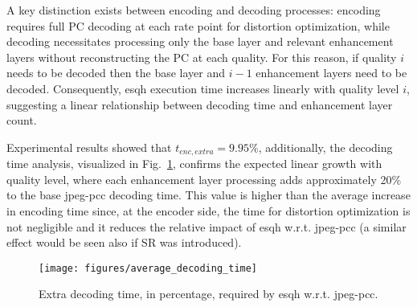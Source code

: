 A key distinction exists between encoding and decoding processes: encoding requires full PC decoding at each rate point for distortion optimization, while decoding necessitates processing only the base layer and relevant enhancement layers without reconstructing the PC at each quality. 
For this reason, if quality $i$ needs to be decoded then the base layer and $i-1$ enhancement layers need to be decoded.
Consequently, \gls{esqh} execution time increases linearly with quality level $i$, suggesting a linear relationship between decoding time and enhancement layer count.

Experimental results showed that $t_{enc, extra} = 9.95\%$, additionally, the decoding time analysis, visualized in Fig.~\ref{fig:extra_dec}, confirms the expected linear growth with quality level, where each enhancement layer processing adds approximately 20\% to the base \gls{jpeg-pcc} decoding time. This value is higher than the average increase in encoding time since, 
at the encoder side, the time for distortion optimization is not negligible and it reduces the relative impact of \gls{esqh} w.r.t. \gls{jpeg-pcc} (a similar effect would be seen also if SR was introduced).

\begin{figure}
    \centering
    \texttt{[image: figures/average\_decoding\_time]}
    \caption{Extra decoding time, in percentage, required by \gls{esqh} w.r.t. \gls{jpeg-pcc}.}
    \label{fig:extra_dec}
\end{figure}
